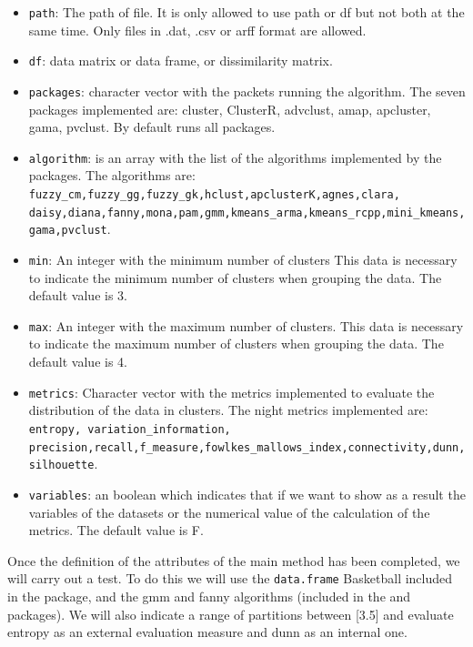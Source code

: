\begin{itemize}
  \item \texttt{path}: The path of file. It is only allowed to use path or df but not both at the same time. Only files in .dat, .csv or arff format are allowed.
  \item \texttt{df}: data matrix or data frame, or dissimilarity matrix.
  \item \texttt{packages}: character vector with the packets running the algorithm. The seven packages implemented are: cluster, ClusterR, advclust, amap, apcluster, gama, pvclust. By default runs all packages.
  \item \texttt{algorithm}: is an array with the list of the algorithms implemented by the packages. The algorithms are: \texttt{fuzzy\_cm,fuzzy\_gg,fuzzy\_gk,hclust,apclusterK,agnes,clara,\\daisy,diana,fanny,mona,pam,gmm,kmeans\_arma,kmeans\_rcpp,mini\_kmeans,gama,pvclust}.
  \item \texttt{min}: An integer with the minimum number of clusters This data is necessary to indicate the minimum number of clusters when grouping the data. The default value is 3.
  \item \texttt{max}: An integer with the maximum number of clusters. This data is necessary to indicate the maximum number of clusters when grouping the data. The default value is 4.
  \item \texttt{metrics}: Character vector with the metrics implemented to evaluate the distribution of the data in clusters. The night metrics implemented are: \texttt{entropy, variation\_information, precision,recall,f\_measure,fowlkes\_mallows\_index,connectivity,dunn,silhouette}.
  \item \texttt{variables}: an boolean which indicates that if we want to show as a result the variables of the datasets or the numerical value of the calculation of the metrics. The default value is F.
\end{itemize}

Once the definition of the attributes of the main method has been completed, we will carry out a test. To do this we will use the \texttt{data.frame} Basketball included in the package, and the gmm and fanny algorithms (included in the  and  packages). We will also indicate a range of partitions between [3.5] and evaluate entropy as an external evaluation measure and dunn as an internal one.

